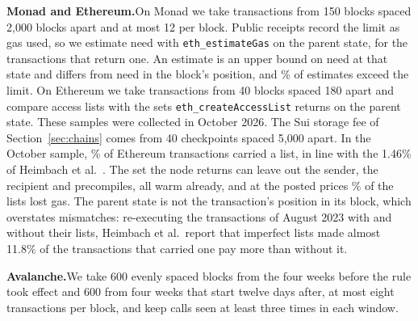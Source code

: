 \documentclass[conference,compsoc]{IEEEtran}
\numberwithin{equation}{section}
\theoremstyle{plain}
\theoremstyle{definition}
\theoremstyle{remark}
\newcommand{\runin}[1]{\par\smallskip\noindent\textbf{#1.}\enspace}
\begin{document}
\runin{Monad and Ethereum}On Monad we take \monadTx{} transactions from 150 blocks spaced 2,000 blocks apart and at most 12 per block. Public receipts record the limit as gas used, so we estimate need with \texttt{eth\_estimateGas} on the parent state, for the \monadEst{} transactions that return one. An estimate is an upper bound on need at that state and differs from need in the block's position, and \monadAboveLimit\% of estimates exceed the limit. On Ethereum we take \ethTx{} transactions from 40 blocks spaced 180 apart and compare \listsChecked{} access lists with the sets \texttt{eth\_createAccessList} returns on the parent state. These samples were collected in October 2026. The Sui storage fee of Section~\ref{sec:chains} comes from 40 checkpoints spaced 5,000 apart. In the October sample, \ethListShare\% of \ethTx{} Ethereum transactions carried a list, in line with the 1.46\% of Heimbach et al.~\cite{heimbach2025dissecting}. The set the node returns can leave out the sender, the recipient and precompiles, all warm already, and at the posted prices \listLoss\% of the lists lost gas. The parent state is not the transaction's position in its block, which overstates mismatches: re-executing the transactions of August 2023 with and without their lists, Heimbach et al.\ report that imperfect lists made almost 11.8\% of the transactions that carried one pay more than without it.

\runin{Avalanche}We take 600 evenly spaced blocks from the four weeks before the rule took effect and 600 from four weeks that start twelve days after, at most eight transactions per block, and keep calls seen at least three times in each window.
\end{document}
